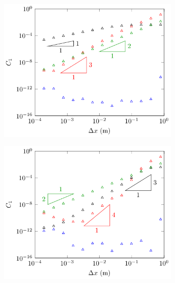 \begin{figure}
	\centering
	\begin{subfigure}{0.5\textwidth}
		\includegraphics[width=\textwidth]{./chp5/figures/Analytic/Soliton/C1/FDVM1.pdf}
	\end{subfigure}%
	\begin{subfigure}{0.5\textwidth}
		\includegraphics[width=\textwidth]{./chp5/figures/Analytic/Soliton/C1/FDVM2.pdf}
	\end{subfigure}
	\begin{subfigure}{0.5\textwidth}

\end{subfigure}
\end{figure}
